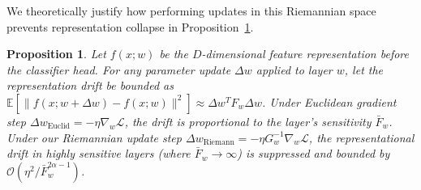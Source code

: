\documentclass{article}
\theoremstyle{plain}
\newtheorem{proposition}[theorem]{Proposition}
\theoremstyle{definition}
\theoremstyle{remark}
\begin{document}
We theoretically justify how performing updates in this Riemannian space prevents representation collapse in Proposition~\ref{prop:stability}.

\begin{proposition}
\label{prop:stability}
Let $f(x; w)$ be the $D$-dimensional feature representation before the classifier head. For any parameter update $\Delta w$ applied to layer $w$, let the representation drift be bounded as $\mathbb{E}[\|f(x; w + \Delta w) - f(x; w)\|^2] \approx \Delta w^T F_w \Delta w$. Under Euclidean gradient step $\Delta w_{\text{Euclid}} = - \eta \nabla_w \mathcal{L}$, the drift is proportional to the layer's sensitivity $\bar{F}_w$. Under our Riemannian update step $\Delta w_{\text{Riemann}} = - \eta G_w^{-1} \nabla_w \mathcal{L}$, the representational drift in highly sensitive layers (where $\bar{F}_w \to \infty$) is suppressed and bounded by $\mathcal{O}(\eta^2 / \bar{F}_w^{2\alpha - 1})$.
\end{proposition}
\end{document}
